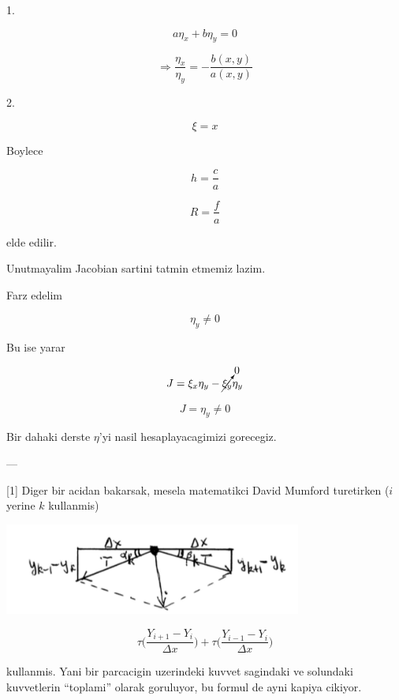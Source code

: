 \documentclass[12pt,fleqn]{article}
\begin{document}
1.

\[ a \eta_x + b \eta_y = 0 \]

\[ \Rightarrow \frac{\eta_x}{\eta_y} = -\frac{b(x,y)}{a(x,y)}\]

2. 

\[ \xi = x \]

Boylece 

\[ h = \frac{c}{a} \]

\[ R = \frac{f}{a} \]

elde edilir. 

Unutmayalim Jacobian sartini tatmin etmemiz lazim. 

Farz edelim 

\[ \eta_y \ne 0 \]

Bu ise yarar

\[ J = \xi_x\eta_y - \cancelto{0}{\xi_y}\eta_y \]

\[ J = \eta_y \ne 0 \]

Bir dahaki derste $\eta$'yi nasil hesaplayacagimizi gorecegiz. 

---

[1] Diger bir acidan bakarsak, mesela matematikci David Mumford
turetirken ($i$ yerine $k$ kullanmis)

\includegraphics[height=3cm]{1_15.png}

\[ 
\tau \bigg( \frac{Y_{i+1}- Y_i}{\Delta x} \bigg) +
\tau \bigg( \frac{Y_{i-1}- Y_{i}}{\Delta x} \bigg) 
\]

kullanmis. Yani bir parcacigin uzerindeki kuvvet sagindaki ve solundaki
kuvvetlerin ``toplami'' olarak goruluyor, bu formul de ayni kapiya cikiyor.
\end{document}
